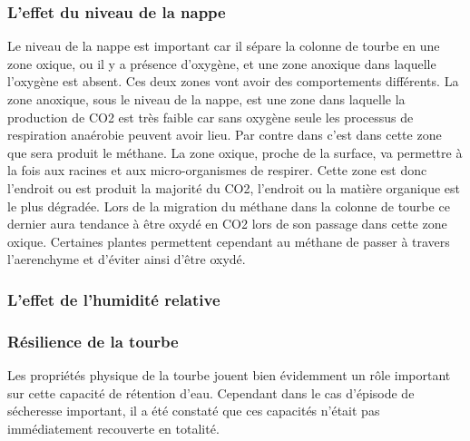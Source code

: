 \subsubsection{L'effet du niveau de la nappe}
Le niveau de la nappe est important car il sépare la colonne de tourbe en une zone oxique, ou il y a présence d'oxygène, et une zone anoxique dans laquelle l'oxygène est absent.
Ces deux zones vont avoir des comportements différents.
La zone anoxique, sous le niveau de la nappe, est une zone dans laquelle la production de CO2 est très faible car sans oxygène seule les processus de respiration anaérobie peuvent avoir lieu.
Par contre dans c'est dans cette zone que sera produit le méthane.
La zone oxique, proche de la surface, va permettre à la fois aux racines et aux micro-organismes de respirer.
Cette zone est donc l'endroit ou est produit la majorité du CO2, l'endroit ou la matière organique est le plus dégradée.
Lors de la migration du méthane dans la colonne de tourbe ce dernier aura tendance à être oxydé en CO2 lors de son passage dans cette zone oxique.
Certaines plantes permettent cependant au méthane de passer à travers l'aerenchyme et d'éviter ainsi d'être oxydé.

\subsubsection{L'effet de l'humidité relative}

\subsubsection{Résilience de la tourbe}
Les propriétés physique de la tourbe jouent bien évidemment un rôle important sur cette capacité de rétention d'eau.
Cependant dans le cas d'épisode de sécheresse important, il a été constaté que ces capacités n'était pas immédiatement recouverte en totalité.



